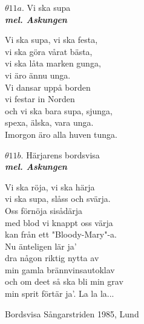 \documentclass[a6paper,10pt]{article}
\newcommand{\mel}[1]{\small\textbf{\textit{mel. #1 \\}}}
\begin{document}
\setlength{\oddsidemargin}{-0.37in}
\begin{center}
\Large $\theta11a$. Vi ska supa \\
\mel{Askungen}
\end{center}
Vi ska supa, vi ska festa,\\
vi ska göra vårat bästa,\\
vi ska låta marken gunga,\\
vi äro ännu unga.\\
Vi dansar uppå borden\\
vi festar in Norden\\
och vi ska bara supa, sjunga, \\
spexa, älska, vara unga.\\
Imorgon äro alla huven tunga.
\begin{center}
\vspace{20pt}
\Large $\theta11b$. Härjarens bordsvisa \\
\mel{Askungen}
\end{center}
Vi ska röja, vi ska härja\\
vi ska supa, slåss och svärja.\\
Oss förnöja sisådärja\\
med blod vi knappt oss värja\\
kan från ett "Bloody-Mary"-a.\\
Nu änteligen lär ja'\\
dra någon riktig nytta av\\
min gamla brännvinsautoklav\\
och om deet så ska bli min grav\\
min sprit förtär ja'.
\vspace{5pt}
La la la...
\begin{flushright}
Bordsvisa Sångarstriden 1985, Lund
\end{flushright}
\end{document}
